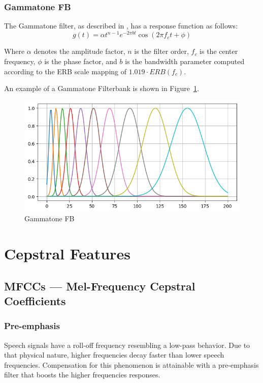 \subsubsection{Gammatone FB}
The Gammatone filter, as described in \cite{gammatonefilt},
has a response function as follows:
\begin{equation}
    g(t) = \alpha t^{n-1}e^{-2\pi bt}\cos \left( 2\pi f_{c} t + \phi\right)
\end{equation}

Where \(\alpha\) denotes the amplitude factor,
\(n\) is the filter order,
\(f_{c}\) is the center frequency,
\(\phi\) is the phase factor,
and \(b\) is the bandwidth parameter
computed according 
to the ERB scale mapping of \(1.019\cdot ERB \left( f_{c} \right)\).

An example of a Gammatone Filterbank
is shown in Figure~\ref{fig:sb_fb_gauss}.
\begin{figure}[H]
    \centering
    \includegraphics[width=0.75\linewidth]{Features/images/sb_fb_gauss}
    \caption{Gammatone FB}\label{fig:sb_fb_gauss}
\end{figure}


\section{Cepstral Features}
\subsection{MFCCs --- Mel-Frequency Cepstral Coefficients}

\subsubsection{Pre-emphasis}
Speech signals have a roll-off frequency 
resembling a low-pass behavior\cite{237532}.
Due to that physical nature, higher frequencies 
decay faster than lower speech frequencies.
Compensation for this phenomenon is attainable with a 
pre-emphasis filter that boosts 
the higher\cite{7489370} frequencies responses.


